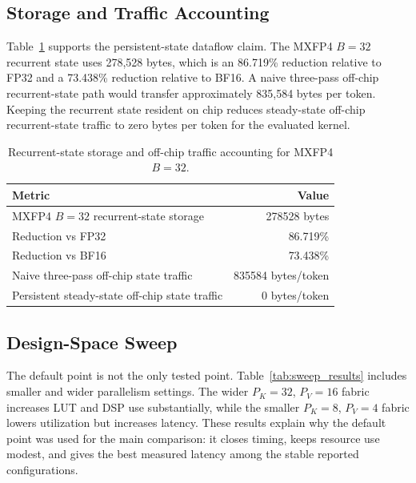 \documentclass[conference]{IEEEtran}
\begin{document}
\subsection{Storage and Traffic Accounting}
Table~\ref{tab:state_traffic_results} supports the persistent-state dataflow claim. The MXFP4 $B=32$ recurrent state uses 278,528 bytes, which is an 86.719\% reduction relative to FP32 and a 73.438\% reduction relative to BF16. A naive three-pass off-chip recurrent-state path would transfer approximately 835,584 bytes per token. Keeping the recurrent state resident on chip reduces steady-state off-chip recurrent-state traffic to zero bytes per token for the evaluated kernel.

\begin{table}[t]
\centering
\caption{Recurrent-state storage and off-chip traffic accounting for MXFP4 $B=32$.}
\label{tab:state_traffic_results}
\footnotesize
\begin{tabularx}{\linewidth}{Xr}
\toprule
Metric & Value \\
\midrule
MXFP4 $B=32$ recurrent-state storage & 278528 bytes \\
Reduction vs FP32 & 86.719\% \\
Reduction vs BF16 & 73.438\% \\
Naive three-pass off-chip state traffic & 835584 bytes/token \\
Persistent steady-state off-chip state traffic & 0 bytes/token \\
\bottomrule
\end{tabularx}
\end{table}

\subsection{Design-Space Sweep}
The default point is not the only tested point. Table~\ref{tab:sweep_results} includes smaller and wider parallelism settings. The wider $P_K=32$, $P_V=16$ fabric increases LUT and DSP use substantially, while the smaller $P_K=8$, $P_V=4$ fabric lowers utilization but increases latency. These results explain why the default point was used for the main comparison: it closes timing, keeps resource use modest, and gives the best measured latency among the stable reported configurations.
\end{document}
